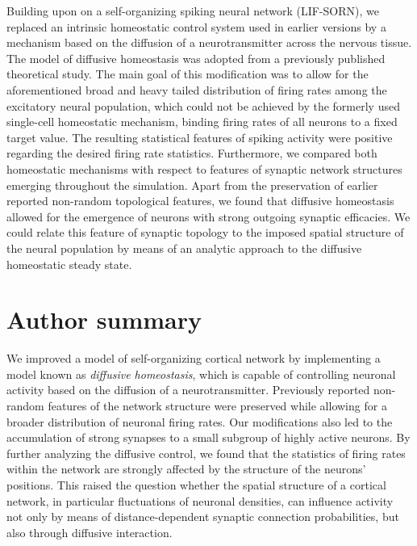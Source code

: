 \documentclass[10pt,letterpaper]{article}
\begin{document}
Building upon on a self-organizing spiking neural network (LIF-SORN), we replaced an intrinsic homeostatic control system used in earlier versions by a mechanism based on the diffusion of a neurotransmitter across the nervous tissue. The model of diffusive homeostasis was adopted from a previously published theoretical study. The main goal of this modification was to allow for the aforementioned broad and heavy tailed distribution of firing rates among the excitatory neural population, which could not be achieved by the formerly used single-cell homeostatic mechanism, binding firing rates of all neurons to a fixed target value. The resulting statistical features of spiking activity were positive regarding the desired firing rate statistics. Furthermore, we compared both homeostatic mechanisms with respect to features of synaptic network structures emerging throughout the simulation. Apart from the preservation of earlier reported non-random topological features, we found that diffusive homeostasis allowed for the emergence of neurons with strong outgoing synaptic efficacies. We could relate this feature of synaptic topology to the imposed spatial structure of the neural population by means of an analytic approach to the diffusive homeostatic steady state.

\section*{Author summary}
We improved a model of self-organizing cortical network by implementing a model known as \textit{diffusive homeostasis}, which is capable of controlling neuronal activity based on the diffusion of a neurotransmitter. Previously reported non-random features of the network structure were preserved while allowing for a broader distribution of neuronal firing rates. Our modifications also led to the accumulation of strong synapses to a small subgroup of highly active neurons. By further analyzing the diffusive control, we found that the statistics of firing rates within the network are strongly affected by the structure of the neurons' positions. This raised the question whether the spatial structure of a cortical network, in particular fluctuations of neuronal densities, can influence activity not only by means of distance-dependent synaptic connection probabilities, but also through diffusive interaction.  
\end{document}
